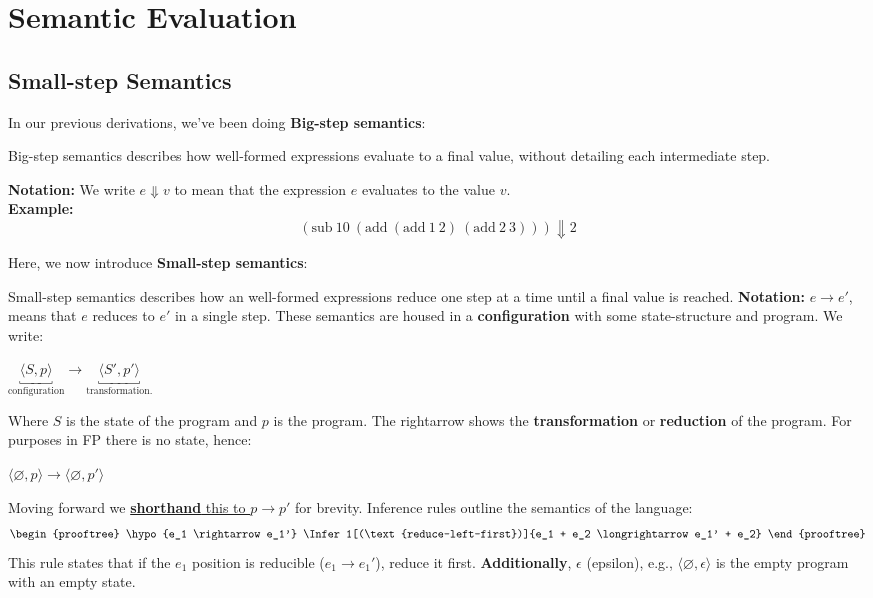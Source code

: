 \newpage
\section{Semantic Evaluation}
\subsection{Small-step Semantics}

\noindent
In our previous derivations, we've been doing \textbf{Big-step semantics}:

\begin{Def}

    Big-step semantics describes how well-formed expressions evaluate to a final value, without detailing each intermediate step.
    
    \medskip
    \noindent\textbf{Notation:} We write $e \Downarrow v$ to mean that the expression $e$ evaluates to the value $v$.\\
    \noindent\textbf{Example:}
    \[
    (\text{sub}\ 10\ (\text{add}\ (\text{add}\ 1\ 2)\ (\text{add}\ 2\ 3))) \Downarrow 2
    \]
    \end{Def}

\noindent
Here, we now introduce \textbf{Small-step semantics}:

\begin{Def}

    Small-step semantics describes how an well-formed expressions reduce one step at a time until a final value is reached.
    \noindent\textbf{Notation:} $e \rightarrow e'$, means that $e$ reduces to $e'$ in a single step. These semantics are 
    housed in a \textbf{configuration} with some state-structure and program. We write:
    
    \begin{center}
    \LARGE
    $\underbracket{\langle S,p\rangle}_{\text{configuration}} \longrightarrow \underbracket{\langle S',p'\rangle}_{\text{transformation.}}$
    \normalsize
    \end{center}
    \noindent
    Where $S$ is the state of the program and $p$ is the program. The rightarrow shows the \textbf{transformation} or \textbf{reduction} of the program.
    For purposes in FP there is no state, hence:
    \begin{center}
    \LARGE
    $\langle \varnothing, p\rangle \longrightarrow \langle \varnothing,p'\rangle$
    \normalsize
    \end{center}
    \noindent
    Moving forward we \underline{\textbf{shorthand} this to $p \rightarrow p'$} for brevity. Inference 
    rules outline the semantics of the language:
    \Large
    \[
    \begin{prooftree}
    \hypo{e_1 \rightarrow e_1'}
    \Infer1[(\text{reduce-left-first})]{e_1 + e_2 \longrightarrow e_1' + e_2}
    \end{prooftree}
    \]
    \normalsize
    \noindent
    This rule states that if the $e_1$ position is reducible ($e_1\to e_1'$), reduce it first. \textbf{Additionally},
    $\epsilon$ (epsilon), e.g., $\langle \varnothing, \epsilon\rangle$ is the empty program with an empty state.

\end{Def}

